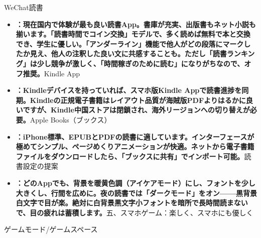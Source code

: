 
WeChat読書

\begin{itemize}
  \item \textbf{：現在国内で体験が最も良い読書App。書庫が充実、出版書もネット小説も揃います。「読書時間でコイン交換」モデルで、多く読めば無料で本と交換でき、学生に優しい。「アンダーライン」機能で他人がどの段落にマークしたか見え、他人の注釈した良い文に共感することも。ただし「読書ランキング」は少し競争が激しく、「時間稼ぎのために読む」になりがちなので、オフ推奨。}Kindle App
  \item \textbf{：Kindleデバイスを持っていれば、スマホ版Kindle Appで読書進捗を同期。Kindleの正規電子書籍はレイアウト品質が海賊版PDFよりはるかに良いですが、Kindle中国ストアは閉鎖され、海外リージョンへの切り替えが必要。}Apple Books（ブックス）
  \item \textbf{：iPhone標準、EPUBとPDFの読書に適しています。インターフェースが極めてシンプル、ページめくりアニメーションが快適。ネットから電子書籍ファイルをダウンロードしたら、「ブックスに共有」でインポート可能。}読書設定の提案
  \item \textbf{：どのAppでも、背景を暖黄色調（アイケアモード）にし、フォントを少し大きくし、行間を広めに。夜の読書では「ダークモード」をオン——黒背景白文字で目が楽。絶対に白背景黒文字小フォントを暗所で長時間読まないで、目の疲れは蓄積します。}五、スマホゲーム：楽しく、スマホにも優しく
\end{itemize}


ゲームモード/ゲームスペース

